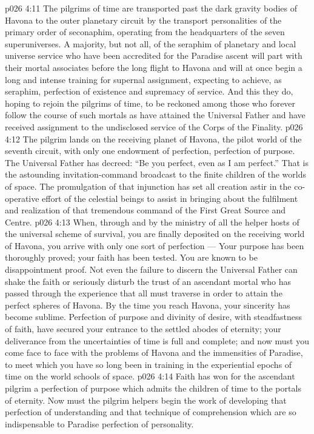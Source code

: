 \vs p026 4:11 The pilgrims of time are transported past the dark gravity bodies of Havona to the outer planetary circuit by the transport personalities of the primary order of seconaphim, operating from the headquarters of the seven superuniverses. A majority, but not all, of the seraphim of planetary and local universe service who have been accredited for the Paradise ascent will part with their mortal associates before the long flight to Havona and will at once begin a long and intense training for supernal assignment, expecting to achieve, as seraphim, perfection of existence and supremacy of service. And this they do, hoping to rejoin the pilgrims of time, to be reckoned among those who forever follow the course of such mortals as have attained the Universal Father and have received assignment to the undisclosed service of the Corps of the Finality.
\vs p026 4:12 The pilgrim lands on the receiving planet of Havona, the pilot world of the seventh circuit, with only one endowment of perfection, perfection of purpose. The Universal Father has decreed: “Be you perfect, even as I am perfect.” That is the astounding invitation\hyp{}command broadcast to the finite children of the worlds of space. The promulgation of that injunction has set all creation astir in the co\hyp{}operative effort of the celestial beings to assist in bringing about the fulfilment and realization of that tremendous command of the First Great Source and Centre.
\vs p026 4:13 When, through and by the ministry of all the helper hosts of the universal scheme of survival, you are finally deposited on the receiving world of Havona, you arrive with only one sort of perfection ---  Your purpose has been thoroughly proved; your faith has been tested. You are known to be disappointment proof. Not even the failure to discern the Universal Father can shake the faith or seriously disturb the trust of an ascendant mortal who has passed through the experience that all must traverse in order to attain the perfect spheres of Havona. By the time you reach Havona, your sincerity has become sublime. Perfection of purpose and divinity of desire, with steadfastness of faith, have secured your entrance to the settled abodes of eternity; your deliverance from the uncertainties of time is full and complete; and now must you come face to face with the problems of Havona and the immensities of Paradise, to meet which you have so long been in training in the experiential epochs of time on the world schools of space.
\vs p026 4:14 Faith has won for the ascendant pilgrim a perfection of purpose which admits the children of time to the portals of eternity. Now must the pilgrim helpers begin the work of developing that perfection of understanding and that technique of comprehension which are so indispensable to Paradise perfection of personality.
